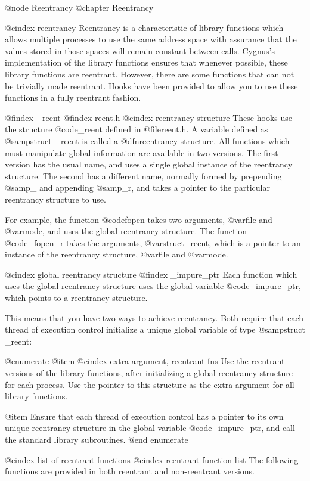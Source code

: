 @node Reentrancy
@chapter Reentrancy

@cindex reentrancy
Reentrancy is a characteristic of library functions which allows multiple
processes to use the same address space with assurance that the values stored
in those spaces will remain constant between calls. Cygnus's implementation
of the library functions ensures that 
whenever possible, these library functions are reentrant.  However,
there are some functions that can not be trivially made reentrant.
Hooks have been provided to allow you to use these functions in a fully
reentrant fashion.

@findex _reent
@findex reent.h
@cindex reentrancy structure
These hooks use the structure @code{_reent} defined in @file{reent.h}.
A variable defined as @samp{struct _reent} is called a @dfn{reentrancy
structure}.  All functions which must manipulate global information are
available in two versions.  The first version has the usual name, and
uses a single global instance of the reentrancy structure.  The second
has a different name, normally formed by prepending @samp{_} and
appending @samp{_r}, and takes a pointer to the particular reentrancy
structure to use.

For example, the function @code{fopen} takes two arguments, @var{file}
and @var{mode}, and uses the global reentrancy structure.  The function
@code{_fopen_r} takes the arguments, @var{struct_reent}, which is a
pointer to an instance of the reentrancy structure, @var{file}
and @var{mode}.	

@cindex global reentrancy structure
@findex _impure_ptr
Each function which uses the global reentrancy structure uses the global
variable @code{_impure_ptr}, which points to a reentrancy structure.

This means that you have two ways to achieve reentrancy.  Both require
that each thread of execution control initialize a unique global
variable of type @samp{struct _reent}:

@enumerate
@item
@cindex extra argument, reentrant fns
Use the reentrant versions of the library functions, after initializing
a global reentrancy structure for each process.  Use the pointer to this
structure as the extra argument for all library functions.

@item
Ensure that each thread of execution control has a pointer to its own
unique reentrancy structure in the global variable @code{_impure_ptr},
and call the standard library subroutines.
@end enumerate

@cindex list of reentrant functions
@cindex reentrant function list
The following functions are provided in both reentrant
and non-reentrant versions.

